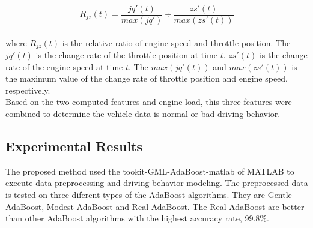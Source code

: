 \begin{equation}
\label{eqa:ada_relative_eng_thr}
R_{jz}(t) = \dfrac{jq'(t)}{max(jq')} \div \dfrac{zs'(t)}{max(zs'(t))}
\end{equation}
\\
where $R_{jz}(t)$ is the relative ratio of engine speed and throttle position. The $jq'(t)$ is the change rate of the throttle position at time $t$. $zs'(t)$ is the change rate of the engine speed at time $t$. The $max(jq'(t))$ and $max(zs'(t))$ is the maximum value of the change rate of throttle position and engine speed, respectively.\\

Based on the two computed features and engine load, this three features were combined to determine the vehicle data is normal or bad driving behavior.

\subsection{Experimental Results}
The proposed method used the tookit-GML-AdaBoost-matlab of MATLAB to execute data preprocessing and driving behavior modeling. The preprocessed data is tested on three diferent types of the AdaBoost algorithms. They are Gentle AdaBoost, Modest AdaBoost and Real AdaBoost. The Real AdaBoost are better than other AdaBoost algorithms with the highest accuracy rate, 99.8\%.